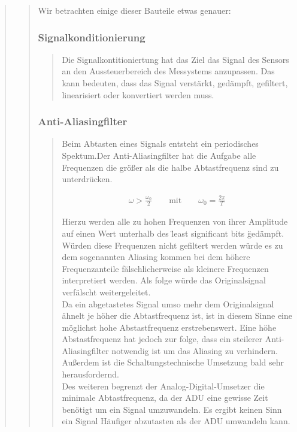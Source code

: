 \begin{quote}
\begin{quote}
	 	Wir betrachten einige dieser Bauteile etwas genauer:
	 	\subsubsection{Signalkonditionierung}
		\begin{quote}
			Die Signalkontitioniertung hat das Ziel das Signal des Sensors an den Aussteuerbereich des Messystems anzupassen. Das
			kann bedeuten, dass das Signal verstärkt, gedämpft, gefiltert, linearisiert oder konvertiert werden muss. 
		\end{quote}
		\subsubsection{Anti-Aliasingfilter}
		\begin{quote}
		      Beim Abtasten eines Signals entsteht ein periodisches Spektum.Der Anti-Aliasingfilter hat die Aufgabe alle
		      Frequenzen die größer als die halbe Abtastfrequenz sind zu unterdrücken. 
		      
		      \begin{equation*}
                	\begin{split}
                		\omega > \frac{\omega_0}{2} \hspace{2em} \text{mit} \hspace{2em} \omega_0 = \frac{2\pi}{T}
                	\end{split}
                \end{equation*}
		      
		      Hierzu werden alle zu hohen Frequenzen von ihrer Amplitude auf einen Wert unterhalb des
              \" least significant bits \" gedämpft.\\
		      
		      Würden diese Frequenzen nicht gefiltert werden würde es zu dem sogenannten Aliasing kommen bei dem höhere
		      Frequenzanteile fälschlicherweise als kleinere Frequenzen interpretiert werden. Als folge würde das
		      Originalsignal verfälscht weitergeleitet.\\
		      
		      Da ein abgetastetes Signal umso mehr dem Originalsignal ähnelt je höher die Abtastfrequenz ist, ist in diesem
		      Sinne eine möglichst hohe Abstastfrequenz erstrebenswert. Eine höhe Abstastfrequenz hat jedoch zur folge, dass
		      ein steilerer Anti-Aliasingfilter notwendig ist um das Aliasing zu verhindern. Außerdem ist die
		      Schaltungstechnische Umsetzung bald sehr herausfordernd.\\
		      Des weiteren begrenzt der Analog-Digital-Umsetzer die minimale Abtastfrequenz, da der ADU eine gewisse Zeit
		      benötigt um ein Signal umzuwandeln. Es ergibt keinen Sinn ein Signal Häufiger abzutasten als der ADU umwandeln
		      kann.
		\end{quote}

\end{quote}
\end{quote}
